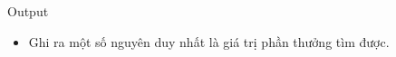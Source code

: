 Output
\begin{itemize}
	\item Ghi ra một số nguyên duy nhất là giá trị phần thưởng tìm được.
\end{itemize}
